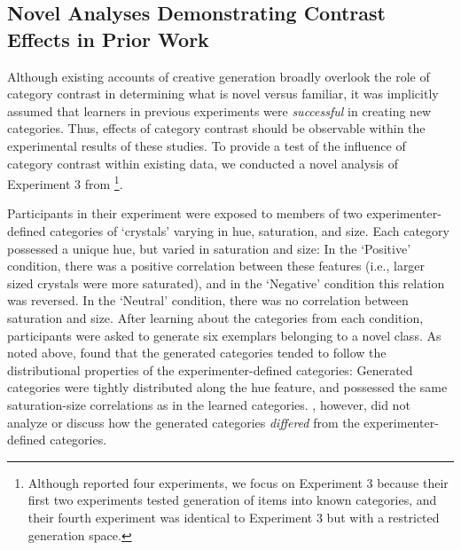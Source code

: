 \documentclass[12pt]{article}
\begin{document}
\begin{flushleft}
\subsection{Novel Analyses Demonstrating Contrast Effects in Prior Work}

Although existing accounts of creative generation broadly overlook the role of category contrast in determining what is novel versus familiar, it was implicitly assumed that learners in previous experiments were {\em successful} in creating new categories. Thus, effects of category contrast should be observable within the experimental results of these studies. To provide a test of the influence of category contrast within existing data, we conducted a novel analysis of Experiment 3 from \cite{jern2013probabilistic}\footnote{Although \cite{jern2013probabilistic} reported four experiments, we focus on Experiment 3 because their first two experiments tested generation of items into known categories, and their fourth experiment was identical to Experiment 3 but with a restricted generation space.}. 

Participants in their experiment were exposed to members of two experimenter-defined categories of `crystals' varying in hue, saturation, and size. Each category possessed a unique hue, but varied in saturation and size: In the `Positive' condition, there was a positive correlation between these features (i.e., larger sized crystals were more saturated), and in the `Negative' condition this relation was reversed. In the `Neutral' condition, there was no correlation between saturation and size. After learning about the categories from each condition, participants were asked to generate six exemplars belonging to a novel class. As noted above, \cite{jern2013probabilistic} found that the generated categories tended to follow the distributional properties of the experimenter-defined categories: Generated categories were tightly distributed along the hue feature, and possessed the same saturation-size correlations as in the learned categories. \cite{jern2013probabilistic}, however, did not analyze or discuss how the generated categories {\em differed} from the experimenter-defined categories. 


\end{flushleft}
\end{document}
